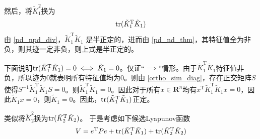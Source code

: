 然后，将$\tilde{K}_1^2$换为\[\operatorname{tr}(\tilde{K}_1^\mathrm{T}\tilde{K}_1)\]
由 \ref{pd_npd_div}，$\tilde{K}_1^\mathrm{T}\tilde{K}_1$ 是半正定的，进而由 \ref{pd_nd_thm}，其特征值全为非负，则其迹一定非负，则上式是半正定的。

下面说明$\operatorname{tr}(\tilde{K}_1^\mathrm{T}\tilde{K}_1)=0\iff \tilde{K}_1=0$。仅证“$\implies$”情形。由于$\tilde{K}_1^\mathrm{T}\tilde{K}_1$特征值非负，所以迹为$0$就表明所有特征值均为$0$。则由 \ref{ortho_sim_diag}，存在正交矩阵$S$使得$S^{-1}\tilde{K}_1^\mathrm{T}\tilde{K}_1S=0$。则$\tilde{K}_1^\mathrm{T}\tilde{K}_1=0$。因此对于所有$x\in\mathbf{R}^{n}$均有$x^{\mathrm{T}}\tilde{K}_1^\mathrm{T}\tilde{K}_1x=0$，因此$\tilde{K}_1x=0$，则$\tilde{K}_1=0$。因此，$\operatorname{tr}(\tilde{K}_1^\mathrm{T}\tilde{K}_1)$正定。

类似将$\tilde{K}_2^2$换为$\operatorname{tr}(\tilde{K}_2^\mathrm{T}\tilde{K}_2)$。
于是考虑如下候选Lyapunov函数
\begin{equation}\label{MODMIMOLYA:modify1}
V=e^\mathrm{T}Pe+\operatorname{tr}(\tilde{K}_1^\mathrm{T}\tilde{K}_1)+\operatorname{tr}(\tilde{K}_2^\mathrm{T}\tilde{K}_2)
\end{equation}

